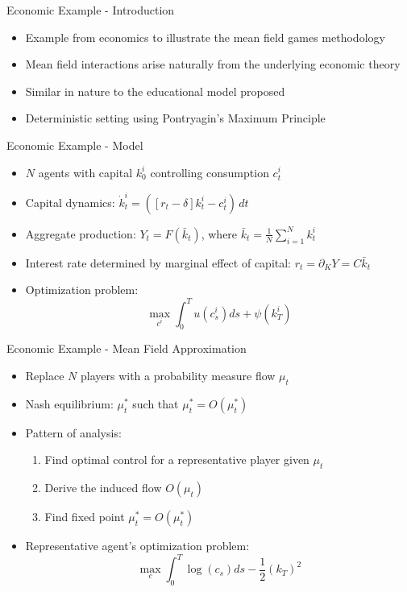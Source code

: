 \documentclass[xcolor=dvipsnames,t,aspectratio=170]{beamer} %
\begin{document}
\begin{frame}{Economic Example - Introduction}
\begin{itemize}
    \item Example from economics to illustrate the mean field games methodology
    \item Mean field interactions arise naturally from the underlying economic theory
    \item Similar in nature to the educational model proposed
    \item Deterministic setting using Pontryagin's Maximum Principle
\end{itemize}
\end{frame}

\begin{frame}{Economic Example - Model}
\begin{itemize}
    \item $N$ agents with capital $k_0^i$ controlling consumption $c_t^i$
    \item Capital dynamics: $\dot k_t^i = \left( \left[r_t - \delta \right] k_t^i - c_t^i \right)\, dt$
    \item Aggregate production: $Y_t = F(\bar k_t)$, where $\bar k_t = \frac{1}{N} \sum_{i = 1}^N k_t^i$
    \item Interest rate determined by marginal effect of capital: $r_t = \partial_K Y = C \bar k_t$
    \item Optimization problem: 
    \begin{equation}
        \max_{c^i } \int_0^T u(c^i_s) ds + \psi(k^i_T)
    \end{equation}
\end{itemize}
\end{frame}

\begin{frame}{Economic Example - Mean Field Approximation}
\begin{itemize}
    \item Replace $N$ players with a probability measure flow $\mu_t$
    \item Nash equilibrium: $\mu_t^*$ such that $\mu_t^* = O(\mu_t^*)$
    \item Pattern of analysis:
    \begin{enumerate}
        \item Find optimal control for a representative player given $\mu_t$
        \item Derive the induced flow $O(\mu_t)$
        \item Find fixed point $\mu_t^* = O(\mu_t^*)$
    \end{enumerate}
    \item Representative agent's optimization problem:
    \begin{equation}
        \max_{c} \int_0^T \log(c_s) ds -\frac{1}{2}{(k_T)}^2
    \end{equation}
\end{itemize}
\end{frame}
\end{document}

